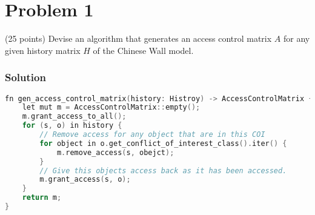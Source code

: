 
\section*{Problem 1}
(25 points) Devise an algorithm that generates an access control matrix $A$ for any given history matrix $H$ of the Chinese Wall model.

\subsubsection*{Solution}
\begin{minipage}{\linewidth}\begin{lstlisting}[language=C]
fn gen_access_control_matrix(history: Histroy) -> AccessControlMatrix {
    let mut m = AccessControlMatrix::empty();
    m.grant_access_to_all();
    for (s, o) in history {
        // Remove access for any object that are in this COI
        for object in o.get_conflict_of_interest_class().iter() {
            m.remove_access(s, obejct);
        }
        // Give this objects access back as it has been accessed.
        m.grant_access(s, o);
    }
    return m;
}
\end{lstlisting}\end{minipage}